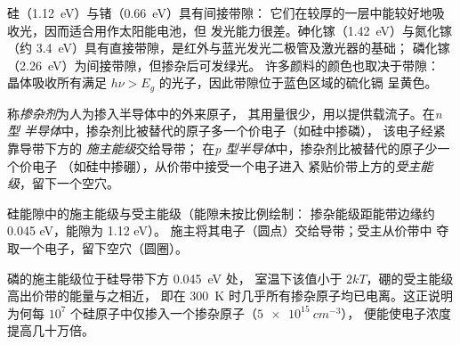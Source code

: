 硅（\qty{1.12}{eV}）与锗（\qty{0.66}{eV}）具有间接带隙：
它们在较厚的一层中能较好地吸收光，因而适合用作太阳能电池，但
发光能力很差。砷化镓（\qty{1.42}{eV}）与氮化镓（约
\qty{3.4}{eV}）具有直接带隙，是红外与蓝光发光二极管及激光器的基础；
磷化镓（\qty{2.26}{eV}）为间接带隙，但掺杂后可发绿光。
许多颜料的颜色也取决于带隙：
晶体吸收所有满足 $h\nu > E_g$ 的光子，因此带隙位于蓝色区域的硫化镉
呈黄色。

\begin{definition}[掺杂]\label{def:b3:solid-state:doping}
称\emph{掺杂剂}为人为掺入半导体中的外来原子，
其用量很少，用以提供载流子。在\emph{n 型
半导体}中，掺杂剂比被替代的原子多一个价电子（如硅中掺磷），
该电子经紧靠导带下方的
\emph{施主能级}交给导带；
在\emph{p 型半导体}中，掺杂剂比被替代的原子少一个价电子
（如硅中掺硼），从价带中接受一个电子进入
紧贴价带上方的\emph{受主能级}，留下一个空穴。
\end{definition}

\begin{omfigure}

{\small 硅能隙中的施主能级与受主能级（能隙未按比例绘制：
掺杂能级距能带边缘约 0.045 eV，能隙为 1.12 eV）。
施主将其电子（圆点）交给导带；受主从价带中
夺取一个电子，留下空穴（圆圈）。}
\end{omfigure}

磷的施主能级位于硅导带下方 \qty{0.045}{eV} 处，
室温下该值小于 $2kT$，硼的受主能级高出价带的能量与之相近，
即在 \qty{300}{K} 时几乎所有掺杂原子均已电离。这正说明
为何每 $10^7$ 个硅原子中仅掺入一个掺杂原子（$\qty{5e15}{cm^{-3}}$），
便能使电子浓度提高几十万倍。

